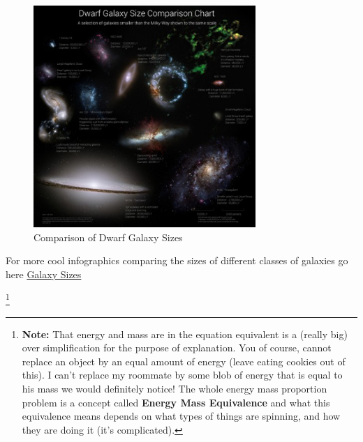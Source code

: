 \documentclass[10pt,letterpaper]{article}
\begin{document}
\begin{figure}[!ht]
\begin{framed}
\begin{center}
\includegraphics[width=0.75\textwidth]{../Images/comparegalaxies.jpg} 
\caption{Comparison of Dwarf Galaxy Sizes}
\end{center}
\end{framed}
\end{figure}

For more cool infographics comparing the sizes of different classes of galaxies go here \href{http://www.rhysy.net/galaxy-sizes.html}{Galaxy Sizes}
  
\footnote{\textbf{Note:} That energy and mass are in the equation equivalent is a (really big) over simplification for the purpose of  explanation. You of course, cannot replace an object by an equal amount of energy (leave eating cookies out of this). I can't replace my roommate by some blob of energy that is equal to his mass we would definitely notice! The whole energy mass proportion problem is a concept called \textbf{Energy Mass Equivalence} and what this equivalence means depends on what types of things are spinning, and how they are doing it (it's complicated).}
\end{document}
